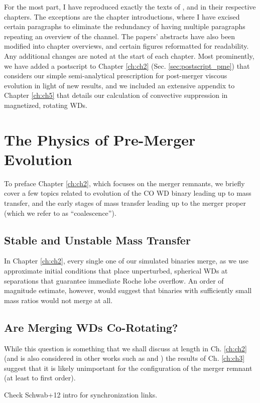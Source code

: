 For the most part, I have reproduced exactly the texts of \citeal{zhu+13}, \citeal{zhu+15} and \citeal{zhu+16} in their respective chapters.  The exceptions are the chapter introductions, where I have excised certain paragraphs to eliminate the redundancy of having multiple paragraphs repeating an overview of the \citeal{vkercj10} channel.  The papers' abstracts have also been modified into chapter overviews, and certain figures reformatted for readability.  Any additional changes are noted at the start of each chapter.  Most prominently, we have added a postscript to Chapter \ref{ch:ch2} (Sec. \ref{sec:postscript_pme}) that considers our simple semi-analytical prescription for post-merger viscous evolution in light of new results, and we included an extensive appendix to Chapter \ref{ch:ch5} that details our calculation of convective suppression in magnetized, rotating WDs.

\section{The Physics of Pre-Merger Evolution}

To preface Chapter \ref{ch:ch2}, which focuses on the merger remnants, we briefly cover a few topics related to evolution of the CO WD binary leading up to mass transfer, and the early stages of mass transfer leading up to the merger proper (which we refer to as ``coalescence'').

\subsection{Stable and Unstable Mass Transfer}

In Chapter \ref{ch:ch2}, every single one of our simulated binaries merge, as we use approximate initial conditions that place unperturbed, spherical WDs at separations that guarantee immediate Roche lobe overflow.  An order of magnitude estimate, however, would suggest that binaries with sufficiently small mass ratios would not merge at all.


\subsection{Are Merging WDs Co-Rotating?}

While this question is something that we shall discuss at length in Ch. \ref{ch:ch2} (and is also considered in other works such as \cite{XXX} and \cite{ji+13}) the results of Ch. \ref{ch:ch3} suggest that it is likely unimportant for the configuration of the merger remnant (at least to first order).

Check Schwab+12 intro for synchronization links.
